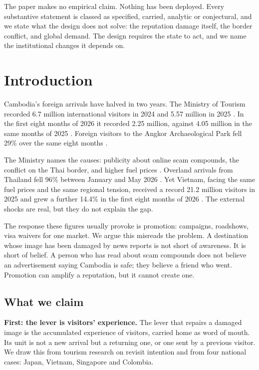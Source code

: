 \documentclass[10pt,letterpaper,twocolumn]{article}
\newcommand{\runin}[1]{\textbf{#1}\quad}
\begin{document}
{The paper makes no empirical claim. Nothing has been deployed. Every
substantive statement is classed as specified, carried, analytic or
conjectural, and we state what the design does not solve: the reputation damage
itself, the border conflict, and global demand. The design requires the state
to act, and we name the institutional changes it depends on.
\par}

\section{Introduction}
\label{sec:intro}

Cambodia's foreign arrivals have halved in two years. The Ministry of Tourism
recorded 6.7 million international visitors in 2024 and 5.57 million in 2025
\citep{cir2026}. In the first eight months of 2026 it recorded 2.25 million,
against 4.05 million in the same months of 2025 \citep{khmertimes2026}. Foreign
visitors to the Angkor Archaeological Park fell 29\% over the same eight months
\citep{peninsula2026}.

The Ministry names the causes: publicity about online scam compounds, the
conflict on the Thai border, and higher fuel prices \citep{thestar2026}.
Overland arrivals from Thailand fell 96\% between January and May 2026
\citep{nomadlawyer2026}. Yet Vietnam, facing the same fuel prices and the same
regional tension, received a record 21.2 million visitors in 2025 and grew a
further 14.4\% in the first eight months of 2026 \citep{wikivn,vnat2026}. The
external shocks are real, but they do not explain the gap.

The response these figures usually provoke is promotion: campaigns, roadshows,
visa waivers for one market. We argue this misreads the problem. A destination
whose image has been damaged by news reports is not short of awareness. It is
short of belief. A person who has read about scam compounds does not believe an
advertisement saying Cambodia is safe; they believe a friend who went.
Promotion can amplify a reputation, but it cannot create one.

\subsection{What we claim}

\runin{First: the lever is visitors' experience.} The lever that repairs a
damaged image is the accumulated experience of visitors, carried home as word of
mouth. Its unit is not a new arrival but a returning one, or one sent by a
previous visitor. We draw this from tourism research on revisit intention and
from four national cases: Japan, Vietnam, Singapore and Colombia.
\end{document}
